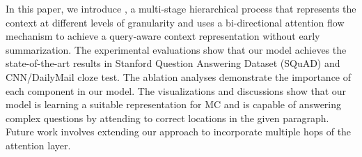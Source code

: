 In this paper, we introduce \sysshort, a multi-stage hierarchical process that represents the context at different levels of granularity and uses a bi-directional attention flow mechanism to achieve a query-aware context representation without early summarization. The experimental evaluations show that our  model achieves the state-of-the-art results in Stanford Question Answering Dataset (SQuAD) and CNN/DailyMail cloze test. The ablation analyses demonstrate the importance of each component in our model. The visualizations and discussions show that our model is learning a suitable representation for MC and is capable of answering complex questions by attending to correct locations in the given paragraph. Future work involves extending our approach to incorporate multiple hops of the attention layer.